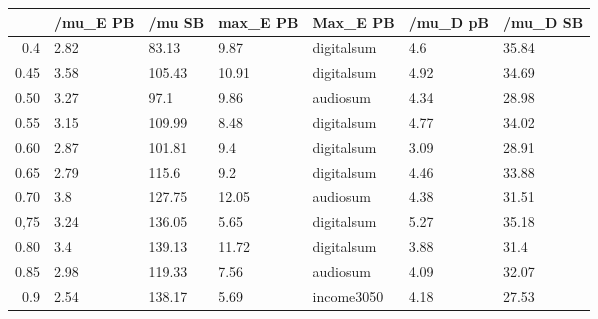 \begin{table}[ht]
\centering
\begin{tabular}{rllllll}
  \hline
 & /mu\_E PB & /mu SB & max\_E PB & Max\_E PB & /mu\_D pB & /mu\_D SB \\ 
  \hline
0.4 & 2.82 & 83.13 & 9.87 & digitalsum & 4.6 & 35.84 \\ 
  0.45 & 3.58 & 105.43 & 10.91 & digitalsum & 4.92 & 34.69 \\ 
  0.50 & 3.27 & 97.1 & 9.86 & audiosum & 4.34 & 28.98 \\ 
  0.55 & 3.15 & 109.99 & 8.48 & digitalsum & 4.77 & 34.02 \\ 
  0.60 & 2.87 & 101.81 & 9.4 & digitalsum & 3.09 & 28.91 \\ 
  0.65 & 2.79 & 115.6 & 9.2 & digitalsum & 4.46 & 33.88 \\ 
  0.70 & 3.8 & 127.75 & 12.05 & audiosum & 4.38 & 31.51 \\ 
  0,75 & 3.24 & 136.05 & 5.65 & digitalsum & 5.27 & 35.18 \\ 
  0.80 & 3.4 & 139.13 & 11.72 & digitalsum & 3.88 & 31.4 \\ 
  0.85 & 2.98 & 119.33 & 7.56 & audiosum & 4.09 & 32.07 \\ 
  0.9 & 2.54 & 138.17 & 5.69 & income3050 & 4.18 & 27.53 \\ 
   \hline
\end{tabular}
\end{table}
